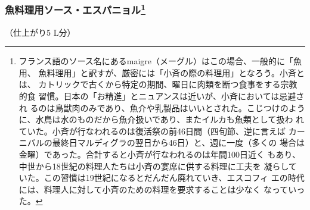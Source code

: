 \begin{recette}
\maeaki

\hypertarget{sauce-espagnole-maigre}{%
\subsubsection[魚料理用ソース・エスパニョル]{\texorpdfstring{魚料理用ソース・エスパニョル\footnote{フランス語のソース名にあるmaigre（メーグル）はこの場合、一般的に「魚用、
  魚料理用」と訳すが、厳密には「小斉の際の料理用」となろう。小斉とは、
  カトリックで古くから特定の期間、曜日に肉類を断つ食事をする宗教的食
  習慣。日本の「お精進」とニュアンスは近いが、小斉においては忌避され
  るのは鳥獣肉のみであり、魚介や乳製品はいいとされた。こじつけのよう
  に、水鳥は水のものだから魚介扱いであり、またイルカも魚類として扱わ
  れていた。小斉が行なわれるのは復活祭の前46日間（四旬節、逆に言えば
  カーニバルの最終日マルディグラの翌日から46日）と、週に一度（多くの
  場合は金曜）であった。合計すると小斉が行なわれるのは年間100日近く
  もあり、中世から18世紀の料理人たちは小斉の宴席に供する料理に工夫を
  凝らしていた。この習慣は19世紀になるとだんだん廃れていき、エスコフィ
  エの時代には、料理人に対して小斉のための料理を要求することは少なく
  なっていった。}}{魚料理用ソース・エスパニョル}}\label{sauce-espagnole-maigre}}



（仕上がり5 L分）


\end{recette}
